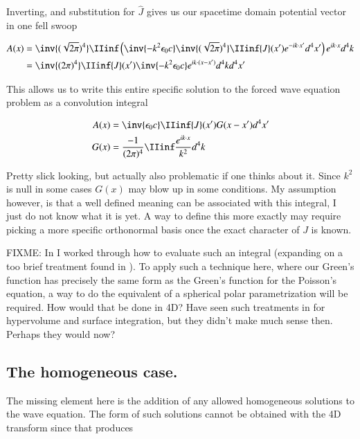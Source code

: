 Inverting, and substitution for $\hat{J}$ gives us our spacetime domain potential vector in one fell swoop

\begin{align*}
A(x)
&= 
\inv{(\sqrt{2\pi})^4} \IIinf 
\left(
\inv{- k^2 \epsilon_0 c} \inv{(\sqrt{2\pi})^4} \IIinf {J}(x') e^{-i k \cdot x' } d^4 x'
\right)
e^{ i k \cdot x } d^4 k \\
&= 
\inv{({2\pi})^4} \IIinf {J}(x') \inv{- k^2 \epsilon_0 c} e^{ i k \cdot (x - x') } d^4 k d^4 x'
\\
\end{align*}

This allows us to write this entire specific solution to the forced wave equation problem as a convolution integral

\begin{align}\label{eqn:4d_fourier:potentialInHomogeneous}
A(x) &= \inv{\epsilon_0 c} \IIinf {J}(x') G(x-x') d^4 x' \\
G(x) &= \frac{-1}{ ({2\pi})^4} \IIinf \frac{e^{ i k \cdot x }}{ k^2 } d^4 k 
\end{align}

Pretty slick looking, but actually also problematic if one thinks about it.  Since $k^2$ is null in some cases
$G(x)$ may blow up in some conditions.  My assumption however, is that a well defined meaning can be associated
with this integral, I just do not know what it is yet.  A way to define this more exactly may require
picking a more specific orthonormal basis once the exact character of $J$ is known.

FIXME: In  I worked through how to evaluate such an integral
(expanding on a too brief treatment found in \cite{byron1992mca}).
To apply such a technique here, where our Green's function has precisely
the same form
as the Green's function for the Poisson's equation, a way to do the
equivalent of a spherical polar parametrization will be required.
How would that be done in 4D?  Have seen such treatments in 
\cite{flanders1989dfa} for hypervolume and surface integration, but they
didn't make much sense then.  Perhaps they would now?

\subsection{The homogeneous case. }

The missing element here is the addition of any allowed homogeneous solutions to the wave equation.
The form of such solutions cannot be obtained with the 4D transform since that produces

